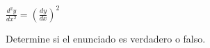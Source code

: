 \item $\displaystyle \frac{d^2y}{dx^2} = \left( \frac{dy}{dx} \right)^2$
\par
Determine si el enunciado es verdadero o falso.
